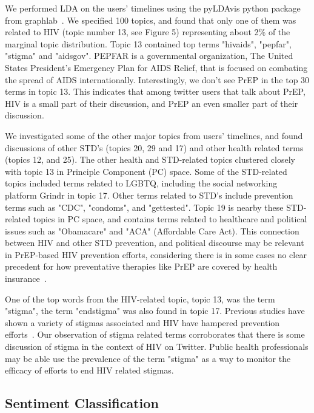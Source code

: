 \documentclass{sig-alternate-05-2015}
\begin{document}
We performed LDA on the users' timelines using the pyLDAvis python package from graphlab~\cite{low2014graphlab}. We specified 100 topics, and found that only one of them was related to HIV (topic number 13, see Figure 5) representing about 2\% of the marginal topic distribution. Topic 13 contained top terms "hivaids", "pepfar", "stigma" and "aidsgov". PEPFAR is a governmental organization, The United States President's Emergency Plan for AIDS Relief, that is focused on combating the spread of AIDS internationally. Interestingly, we don't see PrEP in the top 30 terms in topic 13. This indicates that among twitter users that talk about PrEP, HIV is a small part of their discussion, and PrEP an even smaller part of their discussion.

We investigated some of the other major topics from users' timelines, and found discussions of other STD's (topics 20, 29 and 17) and other health related terms (topics 12, and 25). The other health and STD-related topics clustered closely with topic 13 in Principle Component (PC) space. Some of the STD-related topics included terms related to LGBTQ, including the social networking platform Grindr in topic 17. Other terms related to STD's include prevention terms such as "CDC", "condoms", and "gettested". Topic 19 is nearby these STD-related topics in PC space, and contains terms related to healthcare and political issues such as "Obamacare" and "ACA" (Affordable Care Act). This connection between HIV and other STD prevention, and political discourse may be relevant in PrEP-based HIV prevention efforts, considering there is in some cases no clear precedent for how preventative therapies like PrEP are covered by health insurance~\cite{liu2014early}.

One of the top words from the HIV-related topic, topic 13, was the term "stigma", the term "endstigma" was also found in topic 17. Previous studies have shown a variety of stigmas associated and HIV have hampered prevention efforts~\cite{liu2014early}. Our observation of stigma related terms corroborates that there is some discussion of stigma in the context of HIV on Twitter. Public health professionals may be able use the prevalence of the term "stigma" as a way to monitor the efficacy of efforts to end HIV related stigmas.

\subsection{Sentiment Classification}
\end{document}
